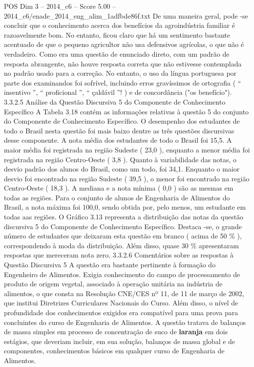 \begin{textsample}{POS Dim 3 – 2014\_c6 – Score 5.00 – 2014\_c6/enade\_2014\_eng\_alim\_1adfbde86f.txt}
De uma maneira geral, pode -se concluir que o conhecimento acerca dos benefícios da agroindústria familiar é razoavelmente bom.
No entanto, ficou claro que há um sentimento bastante acentuado de que o pequeno agricultor não usa defensivos agrícolas, o que não é verdadeiro.
Como era uma questão de enunciado direto, com um padrão de resposta abrangente, não houve resposta correta que não estivesse contemplada no padrão usado para a correção.
No entanto, o uso da língua portuguesa por parte dos examinandos foi sofrível, incluindo erros gravíssimos de ortografia ( “ insentivo ”, “ proficional ”, “ çaldávil ”! ) e de concordância ("os benefício"). 3.3.2.5 Análise da Questão Discursiva 5 do Componente de Conhecimento Específico A Tabela 3.18 contém as informações relativas à questão 5 do conjunto do Componente de Conhecimento Específico.
O desempenho dos estudantes de todo o Brasil nesta questão foi mais baixo dentre as três questões discursivas desse componente.
A nota média dos estudantes de todo o Brasil foi 15,5.
A maior média foi registrada na região Sudeste ( 23,0 ), enquanto a menor média foi registrada na região Centro-Oeste ( 3,8 ).
Quanto à variabilidade das notas, o desvio padrão dos alunos do Brasil, como um todo, foi 34,1.
Enquanto o maior desvio foi encontrado na região Sudeste ( 39,5 ), o menor foi encontrado na região Centro-Oeste ( 18,3 ).
A mediana e a nota mínima ( 0,0 ) são as mesmas em todas as regiões.
Para o conjunto de alunos de Engenharia de Alimentos do Brasil, a nota máxima foi 100,0, sendo obtida por, pelo menos, um estudante em todas aas regiões.
O Gráfico 3.13 representa a distribuição das notas da questão discursiva 5 do Componente de Conhecimento Específico.
Destaca -se, o grande número de estudantes que deixaram esta questão em branco ( acima de 50 \% ), correspondendo à moda da distribuição.
Além disso, quase 30 \% apresentaram respostas que mereceram nota zero. 3.3.2.6 Comentários sobre as respostas à Questão Discursiva 5 A questão era bastante pertinente à formação do Engenheiro de Alimentos.
Exigia conhecimento do campo de processamento de produto de origem vegetal, associado à operação unitária na indústria de alimentos, o que consta na Resolução CNE/CES nº 11, de 11 de março de 2002, que institui Diretrizes Curriculares Nacionais do Curso.
Além disso, o nível de profundidade dos conhecimentos exigidos era compatível para uma prova para concluintes do curso de Engenharia de Alimentos.
A questão tratava de balanços de massa simples em processo de concentração de suco de \textbf{laranja} em dois estágios, que deveriam incluir, em sua solução, balanços de massa global e de componentes, conhecimentos básicos em qualquer curso de Engenharia de Alimentos.

\end{textsample}
